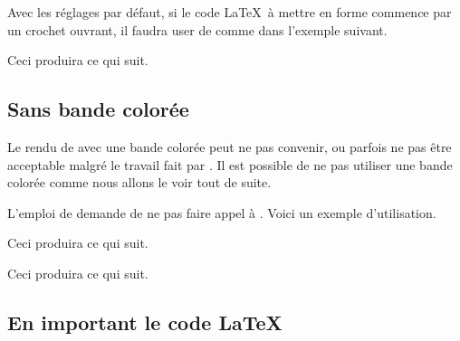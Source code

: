 

\begin{tdocwarn}
    Avec les réglages par défaut, si le code \LaTeX\ à mettre en forme commence par un crochet ouvrant, il faudra user de  comme dans l'exemple suivant.



    Ceci produira ce qui suit.
\end{tdocwarn}





\subsection{Sans bande colorée}

Le rendu de  avec une bande colorée peut ne pas convenir, ou parfois ne pas être acceptable malgré le travail fait par .
Il est possible de ne pas utiliser une bande colorée comme nous allons le voir tout de suite.


\begin{tdocexa}
    L'emploi de  demande de ne pas faire appel à .
    Voici un exemple d'utilisation.



    Ceci produira ce qui suit.

    \medskip

    

\end{tdocexa}




\begin{tdocexa}
    \leavevmode



    Ceci produira ce qui suit.

    \medskip

    

\end{tdocexa}


\subsection{En important le code \LaTeX}

